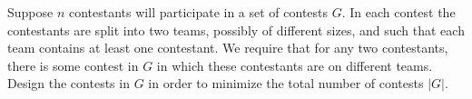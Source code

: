 \problem{}
Suppose $n$ contestants will participate in a set of contests $G$.  In each contest the contestants are split into two teams, possibly of different sizes, and such that each team contains at least one contestant.  We require that for any two contestants, there is some contest in $G$ in which these contestants are on different teams.  Design the contests in $G$ in order to minimize the total number of contests $|G|$.














\newpage